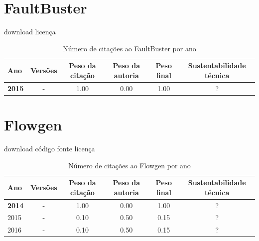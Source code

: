 \section{FaultBuster}
\checkmark download
\checkmark licença



\begin{table}[H]
\caption{Número de citações ao FaultBuster por ano}
\centering
\begin{tabular}{| l | c | c | c | c | c |}
  \hline
  Ano & Versões & Peso da citação & Peso da autoria & Peso final & Sustentabilidade técnica \\
  \hline
            {\bf 2015}
          &
          -
          &
          1.00
          &
          0.00
          &
            {\color{blue} 1.00}
          &
          ?
          \\
\hline
\end{tabular}
\end{table}



\section{Flowgen}
\checkmark download
\checkmark código fonte
\checkmark licença



\begin{table}[H]
\caption{Número de citações ao Flowgen por ano}
\centering
\begin{tabular}{| l | c | c | c | c | c |}
  \hline
  Ano & Versões & Peso da citação & Peso da autoria & Peso final & Sustentabilidade técnica \\
  \hline
            {\bf 2014}
          &
          -
          &
          1.00
          &
          0.00
          &
            {\color{blue} 1.00}
          &
          ?
          \\
\hline
            2015
          &
          -
          &
          0.10
          &
          0.50
          &
            {\color{red} 0.15}
          &
          ?
          \\
\hline
            2016
          &
          -
          &
          0.10
          &
          0.50
          &
            {\color{red} 0.15}
          &
          ?
          \\
\hline
\end{tabular}
\end{table}



